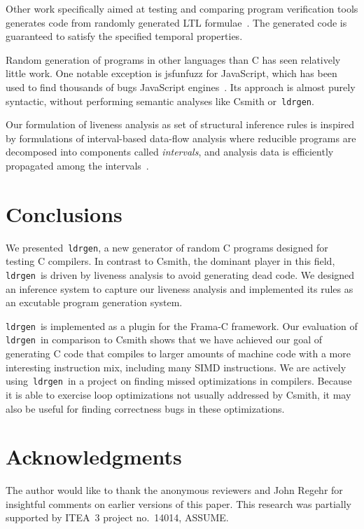 \documentclass{llncs}
\newcommand\ldrgen{\texttt{ldrgen}}
\begin{document}
Other work specifically aimed at testing and comparing program verification
tools generates code from randomly generated LTL
formulae~\cite{steffen.etal-2014}. The generated code is guaranteed to
satisfy the specified temporal properties.

Random generation of programs in other languages than C has seen relatively
little work. One notable exception is jsfunfuzz for JavaScript, which has
been used to find thousands of bugs JavaScript engines~\cite{jsfunfuzz}. Its
approach is almost purely syntactic, without performing semantic analyses
like Csmith or~\ldrgen.

Our formulation of liveness analysis as set of structural inference rules is
inspired by formulations of interval-based data-flow analysis where
reducible programs are decomposed into components called \emph{intervals},
and analysis data is efficiently propagated among the
intervals~\cite{allen-1970,cocke-1970,graham.wegman-1976}.

\section{Conclusions}

We presented~\ldrgen, a new generator of random C programs designed for
testing C compilers. In contrast to Csmith, the dominant player in this
field, \ldrgen\ is driven by liveness analysis to avoid generating dead
code. We designed an inference system to capture our liveness analysis and
implemented its rules as an excutable program generation system.

\ldrgen\ is implemented as a plugin for the Frama-C framework. Our
evaluation of \ldrgen\ in comparison to Csmith shows that we have achieved
our goal of generating C code that compiles to larger amounts of machine
code with a more interesting instruction mix, including many SIMD
instructions. We are actively using~\ldrgen\ in a project on finding missed
optimizations in compilers. Because it is able to exercise loop
optimizations not usually addressed by Csmith, it may also be useful for
finding correctness bugs in these optimizations.

\section*{Acknowledgments}

The author would like to thank the anonymous reviewers and John Regehr for
insightful comments on earlier versions of this paper.
This research was partially supported by ITEA~3 project no.~14014, ASSUME.




\end{document}
